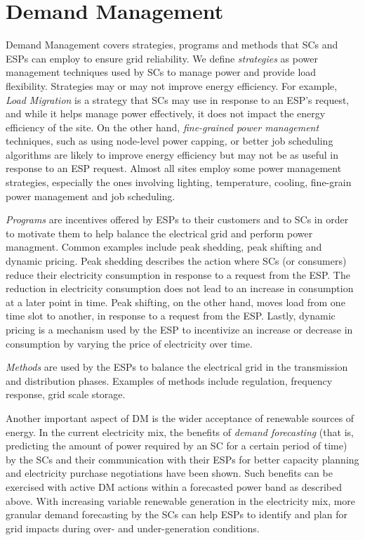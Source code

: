 \section{Demand Management}
\label{dm}
Demand Management covers strategies, programs and methods that SCs and ESPs can employ to ensure grid reliability. We define \emph{strategies} as power management techniques used by SCs to manage power and provide load flexibility. Strategies may or may not improve energy efficiency. For example, \emph{Load Migration} is a strategy that SCs may use in response to an ESP's request, and while it helps manage power effectively, it does not impact the energy efficiency of the site. On the other hand, \emph{fine-grained power management} techniques, such as using node-level power capping, or better job scheduling algorithms are likely to improve energy efficiency but may not be as useful in response to an ESP request. Almost all sites employ some power management strategies, especially the ones involving lighting, temperature, cooling, fine-grain power management and job scheduling. 

\emph{Programs} are incentives offered by ESPs to their customers and to SCs in order to motivate them to help balance the electrical grid and perform power managment. Common examples include peak shedding, peak shifting and dynamic pricing. Peak shedding describes the action where SCs (or consumers) reduce their electricity consumption in response to a request from the ESP. The reduction in electricity consumption does not lead to an increase in consumption at a later point in time. Peak shifting, on the other hand, moves load from one time slot to another, in response to a request from the ESP. Lastly, dynamic pricing is a mechanism used by the ESP to incentivize an increase or decrease in consumption by varying the price of electricity over time.

\emph{Methods} are used by the ESPs to balance the electrical grid in the transmission and distribution phases. Examples of methods include regulation, frequency response, grid scale storage. %

Another important aspect of DM is the wider acceptance of renewable sources of energy. In the current electricity mix, the benefits of \emph{demand forecasting} (that is, predicting the amount of power required by an SC for a certain period of time) by the SCs and their communication with their ESPs for better capacity planning and electricity purchase negotiations have been shown. Such benefits can be exercised with active DM actions within a forecasted power band as described above. With increasing variable renewable generation in the electricity mix, more granular demand forecasting by the SCs can help ESPs to identify and plan for grid impacts during over- and under-generation conditions. 
